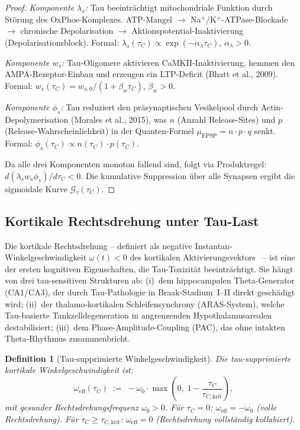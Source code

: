 ﻿\documentclass[12pt,a4paper]{article}
\newtheorem{definition}[theorem]{Definition}
\theoremstyle{definition}
\begin{document}
	\begin{proof}
		\emph{Komponente $\lambda_s$:} Tau beeinträchtigt mitochondriale Funktion durch
		Störung des OxPhos-Komplexes. ATP-Mangel $\to$ Na$^+$/K$^+$-ATPase-Blockade $\to$
		chronische Depolarisation $\to$ Aktionspotential-Inaktivierung (Depolarisationsblock).
		Formal: $\lambda_s(\tau_C) \propto \exp(-\alpha_\lambda \tau_C)$, $\alpha_\lambda > 0$.

		\emph{Komponente $w_s$:} Tau-Oligomere aktivieren CaMKII-Inaktivierung, hemmen den
		AMPA-Rezeptor-Einbau und erzeugen ein LTP-Deficit (Bhatt et al., 2009).
		Formal: $w_s(\tau_C) = w_{s,0}/(1 + \beta_w \tau_C)$, $\beta_w > 0$.

		\emph{Komponente $\phi_s$:} Tau reduziert den präsynaptischen Vesikelpool durch
		Actin-Depolymeri\-sation (Morales et al., 2015), was $n$ (Anzahl Release-Sites) und $p$
		(Release-Wahrscheinlich\-keit) in der Quanten-Formel $\mu_\mathrm{EPSP} = n \cdot p \cdot q$
		senkt. Formal: $\phi_s(\tau_C) \propto n(\tau_C) \cdot p(\tau_C)$.

		Da alle drei Komponenten monoton fallend sind, folgt via Produktregel:
		$d(\lambda_s w_s \phi_s)/d\tau_C < 0$.
		Die kumulative Suppression über alle Synapsen ergibt die sigmoidale Kurve
		$\mathcal{G}_\tau(\tau_C)$.
	\end{proof}

	\subsection{Kortikale Rechtsdrehung unter Tau-Last}

	Die kortikale Rechtsdrehung -- definiert als negative Instantan-Winkelgeschwindigkeit
	$\omega(t) < 0$ des kortikalen Aktivierungsvektors~\cite{Epp2026brn} -- ist eine der
	ersten kognitiven Eigenschaften, die Tau-Toxizität beeinträchtigt. Sie hängt von drei
	tau-sensitiven Strukturen ab: (i)~dem hippocampalen Theta-Generator (CA1/CA3), der durch
	Tau-Pathologie in Braak-Stadium~I--II direkt geschädigt wird; (ii)~der thalamo-kortikalen
	Schleifensynchrony (ARAS-System), welche Tau-basierte Tankzelldegeneration in angrenzenden
	Hypothalamusarealen destabilisiert; (iii)~dem Phase-Amplitude-Coupling (PAC),
	das ohne intakten Theta-Rhythmus zusammenbricht.

	\begin{definition}[Tau-supprimierte Winkelgeschwindigkeit]
		\label{def:omega_tau}
		Die \emph{tau-supprimierte kortikale Winkelgeschwindigkeit} ist:
		\[
			\omega_{\mathrm{eff}}(\tau_C)
			\;:=\;
			-\omega_0 \cdot \max\!\left(0,\; 1 - \frac{\tau_C}{\tau_{C,\mathrm{krit}}}\right),
		\]
		mit gesunder Rechtsdrehungsfrequenz $\omega_0 > 0$. Für $\tau_C = 0$:
		$\omega_{\mathrm{eff}} = -\omega_0$ (volle Rechtsdrehung). Für
		$\tau_C \geq \tau_{C,\mathrm{krit}}$: $\omega_{\mathrm{eff}} = 0$
		(Rechtsdrehung vollständig kollabiert).
	\end{definition}
\end{document}
